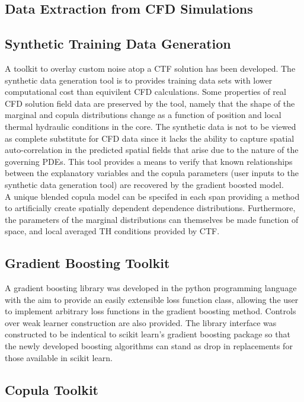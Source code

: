 \subsection{Data Extraction from CFD Simulations}

\subsection{Synthetic Training Data Generation}

A toolkit to overlay custom noise atop a CTF solution has been developed.  The synthetic data generation tool is to provides training data sets with lower computational cost than equivilent CFD calculations.  Some properties of real CFD solution field data are preserved by the tool, namely that the shape of the marginal and copula distributions change as a function of position and local thermal hydraulic conditions in the core.  The synthetic data is not to be viewed as complete substitute for CFD data since it lacks the ability to capture spatial auto-correlation in the predicted spatial fields that arise due to the nature of the governing PDEs.
This tool provides a means to verify that known relationships between the explanatory variables and the copula parameters (user inputs to the synthetic data generation tool) are recovered by the gradient boosted model. \\

A unique blended copula model can be specifed in each span providing a method to artificially create spatially dependent dependence distributions.
Furthermore, the parameters of the marginal distributions can themselves be made function of space, and local averaged TH conditions provided by CTF.

\subsection{Gradient Boosting Toolkit}

A gradient boosting library was developed in the python programming language with the aim to provide an easily extensible loss function class, allowing the user to implement arbitrary loss functions in the gradient boosting method.   Controls over weak learner construction are also provided.
The library interface was constructed to be indentical to scikit learn's gradient boosting package so that the newly developed boosting algorithms can stand as drop in replacements for those available in scikit learn.

\subsection{Copula Toolkit}


